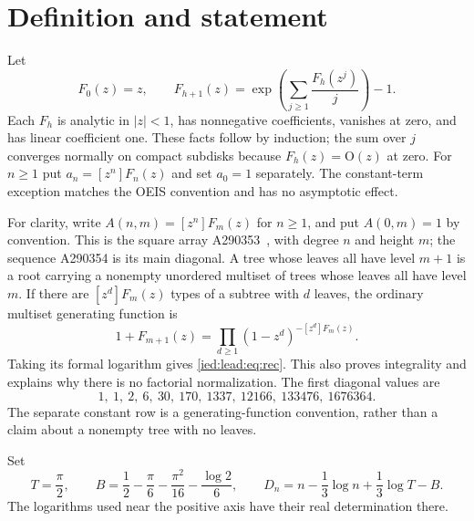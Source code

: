 \documentclass[11pt,letterpaper]{article}
\theoremstyle{remark}\newtheorem{remark}[theorem]{Remark}
\newcommand{\Oh}{\mathrm O}\newcommand{\supp}{\operatorname{supp}}
\begin{document}
\section{Definition and statement}\label{ied:lead:sec:statement}
Let
\begin{equation}\label{ied:lead:eq:rec}
 F_0(z)=z,\qquad
 F_{h+1}(z)=\exp\left(\sum_{j\ge1}\frac{F_h(z^j)}j\right)-1.
\end{equation}
Each $F_h$ is analytic in $|z|<1$, has nonnegative coefficients, vanishes at zero, and has linear coefficient one. These facts follow by induction; the sum over $j$ converges normally on compact subdisks because $F_h(z)=\Oh(z)$ at zero. For $n\ge1$ put $a_n=[z^n]F_n(z)$ and set $a_0=1$ separately. The constant-term exception matches the OEIS convention and has no asymptotic effect.

For clarity, write $A(n,m)=[z^n]F_m(z)$ for $n\ge1$, and put $A(0,m)=1$ by convention. This is the square array A290353~\cite{A290353}, with degree $n$ and height $m$; the sequence A290354 is its main diagonal. A tree whose leaves all have level $m+1$ is a root carrying a nonempty unordered multiset of trees whose leaves all have level $m$. If there are $[z^d]F_m(z)$ types of a subtree with $d$ leaves, the ordinary multiset generating function is
\begin{equation}\label{ied:lead:eq:eulerproduct}
 1+F_{m+1}(z)=\prod_{d\ge1}(1-z^d)^{-[z^d]F_m(z)}.
\end{equation}
Taking its formal logarithm gives \eqref{ied:lead:eq:rec}. This also proves integrality and explains why there is no factorial normalization. The first diagonal values are
\[
1,\ 1,\ 2,\ 6,\ 30,\ 170,\ 1337,\ 12166,\ 133476,\ 1676364.
\]
The separate constant row is a generating-function convention, rather than a claim about a nonempty tree with no leaves.


Set
\begin{equation}\label{ied:lead:eq:constants}
 T=\frac\pi2,\qquad
 B=\frac12-\frac\pi6-\frac{\pi^2}{16}-\frac{\log2}{6},\qquad
 D_n=n-\frac13\log n+\frac13\log T-B.
\end{equation}
The logarithms used near the positive axis have their real determination there.
\end{document}
